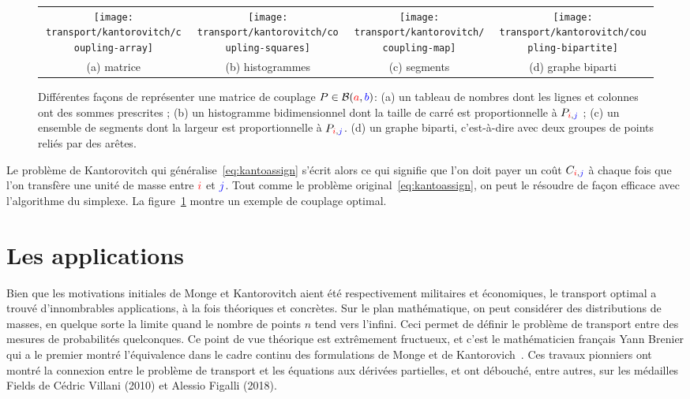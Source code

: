 \begin{figure}\centering
    \begin{tabular}{@{}c@{\hspace{1mm}}c@{\hspace{1mm}}c@{\hspace{1mm}}c@{}}
        \texttt{[image: transport/kantorovitch/coupling-array]}&
        \texttt{[image: transport/kantorovitch/coupling-squares]}&
        \texttt{[image: transport/kantorovitch/coupling-map]}&
        \texttt{[image: transport/kantorovitch/coupling-bipartite]} \\
        (a) matrice & (b) histogrammes & (c) segments & (d) graphe biparti
    \end{tabular}
    \caption{\label{fig:coupling-visu} Différentes façons de représenter une matrice de couplage $P \in \mathcal{B}({\color{red}a},{\color{blue}b})$:
    	(a) un tableau de nombres dont les lignes et colonnes ont des sommes prescrites ; 
		(b) un histogramme bidimensionnel dont la taille de carré est proportionnelle à $P_{{\color{red}i},{\color{blue}j}}$ ; 
		(c) un ensemble de segments dont la largeur est proportionnelle à $P_{{\color{red}i},{\color{blue}j}}$. 
		(d) un graphe biparti, c'est-à-dire avec deux groupes de points reliés par des arêtes.   } 
\end{figure}


Le problème de Kantorovitch qui généralise~\eqref{eq:kantoassign} s'écrit alors
ce qui signifie que l'on doit payer un coût  $C_{{\color{red}i},{\color{blue}j}}$ à chaque fois que l'on transfère une unité de masse entre ${\color{red}i}$ et ${\color{blue}j}$. Tout comme le problème original~\eqref{eq:kantoassign}, on peut le résoudre de façon efficace avec l'algorithme du simplexe.  La figure~\ref{fig:coupling-visu} montre un exemple de couplage optimal. 



\section{Les applications}

Bien que les motivations initiales de Monge et Kantorovitch aient été respectivement militaires et économiques, le transport optimal a trouvé d'innombrables applications, à la fois théoriques et concrètes. Sur le plan mathématique, on peut considérer des distributions  de masses, en quelque sorte la limite quand le nombre de points $n$ tend vers l'infini. Ceci permet de définir le problème de transport entre des mesures de probabilités quelconques. Ce point de vue théorique est extrêmement fructueux, et c'est le mathématicien français Yann Brenier qui a le premier montré l'équivalence dans le cadre continu des formulations de Monge et de Kantorovich~\cite{Brenier91}. Ces travaux pionniers ont montré la connexion entre le problème de transport et les équations aux dérivées partielles, et ont débouché, entre autres, sur les médailles Fields de Cédric Villani (2010) et Alessio Figalli (2018). 

